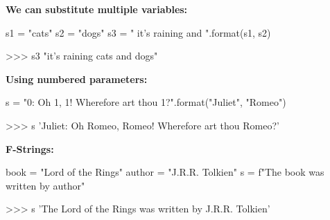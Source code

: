 \documentclass[12pt]{article}
\numberwithin{equation}{section}
\begin{document}
\textbf{We can substitute multiple variables:}
\begin{python}
s1 = "cats"
s2 = "dogs"
s3 = " it's raining {} and {} ".format(s1, s2)

>>> s3
"it's raining cats and dogs"
\end{python}

\textbf{Using numbered parameters:}
\begin{python}
s = "{0}: Oh {1}, {1}! Wherefore art thou {1}?".format("Juliet", "Romeo")

>>> s
'Juliet: Oh Romeo, Romeo! Wherefore art thou Romeo?'
\end{python}

\textbf{F-Strings:}
\begin{python}
book = "Lord of the Rings"
author = "J.R.R. Tolkien"
s = f"The {book} was written by {author}" 

>>> s
'The Lord of the Rings was written by J.R.R. Tolkien'
\end{python}
\end{document}

